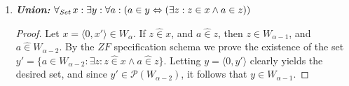 \documentclass[11pt]{report}
\newcommand{\all}[1]{\forall_{\mathit{#1}}\hspace{0.5mm}}
\newcommand{\pleft}{\mathrel{\pi_1}}
\newcommand{\pright}{\mathrel{\pi_2}}
\newcommand{\pair}[2]{\langle #1,#2 \rangle}
\newcommand{\zin}{\mathrel{\widehat{\in}}}
\newcommand{\zpright}{\mathrel{\widehat{\pi}_2}}
\newcommand{\zpleft}{\mathrel{\widehat{\pi}_1}}
\theoremstyle{definition}
\theoremstyle{theorem}
\theoremstyle{lemma}
\begin{document}
\begin{enumerate}[resume=axiomlist, label=\Roman*.]
  \begin{enumerate}[resume=sublist,label=(\roman*)]
    \item \textit{\textbf{Ordered Pairs:}}
    $\forall a,b: (\exists p: a\pleft p \wedge b\pright p)$
  \end{enumerate}
  \begin{proof}
  Let $a,b\in W$ , then $a,b\in W_\alpha$ for some ordinal $\alpha$.
  Now let $p = \pair{1}{p'}$ where $p'=\pair{a}{b} \in W_\alpha^2$, and so $p\in W_{\alpha+1}$, and $a\zpleft p$, $b\zpright p$.
  \end{proof}

\item \textit{\textbf{Union:}}
      $\all{Set} x: \exists y: \forall a: (a\in y \Leftrightarrow (\exists z: z\in x \wedge a\in z))$
  \begin{proof}


  Let $x=\pair{0}{x'}\in W_\alpha$.
  If $z\zin x$, and $a\zin z$, then $z\in W_{\alpha-1}$, and $a\zin W_{\alpha-2}$. 
  By the $\mathit{ZF}$ specification schema we prove the existence of the set $y' = \{a\in W_{\alpha-2} : \exists z: z\zin x \wedge a\zin z\}$.
  Letting $y=\pair{0}{y'}$ clearly yields the desired set, and since $y'\in\mathcal{P}(W_{\alpha-2})$, it follows that $y\in W_{\alpha-1}$. 
\end{proof}


\end{enumerate}
\end{document}
